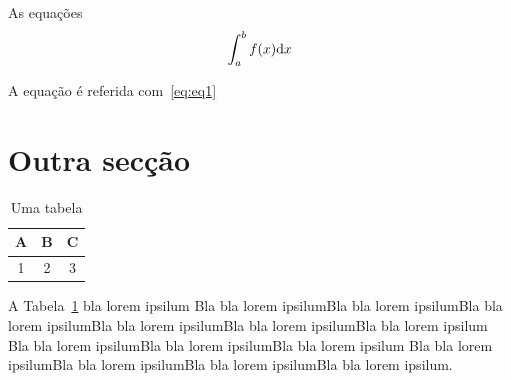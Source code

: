 As equações
\begin{equation}\label{eq:eq1}
  \int_a^b f(x){\rm d}x
\end{equation}

A equação é referida com~\eqref{eq:eq1}

\section{Outra secção}

\begin{table}
  {\centering
  \begin{tabular}{c|c|c}
    A & B & C \\    \hline
    1 & 2 & 3
  \end{tabular}\caption{Uma tabela}\label{tab:tabela}
  \par}
\end{table}


A Tabela~\ref{tab:tabela} bla lorem ipsilum Bla bla lorem ipsilumBla bla lorem ipsilumBla bla
lorem ipsilumBla bla lorem ipsilumBla bla lorem ipsilumBla bla lorem
ipsilum Bla bla lorem ipsilumBla bla lorem ipsilumBla bla lorem ipsilum
Bla bla lorem ipsilumBla bla lorem ipsilumBla bla lorem ipsilumBla bla
lorem ipsilum.
